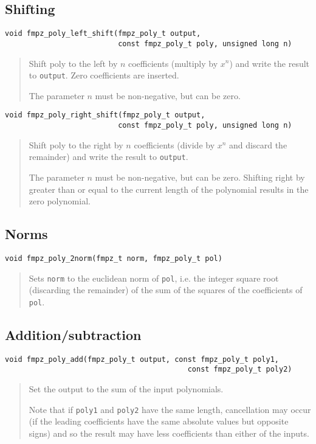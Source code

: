 \documentclass[a4paper,10pt]{article}
\newcommand{\code}{\lstinline}
\begin{document}
\subsection{Shifting}

\begin{lstlisting}
void fmpz_poly_left_shift(fmpz_poly_t output, 
                          const fmpz_poly_t poly, unsigned long n) 
\end{lstlisting}
\begin{quote}
Shift poly to the left by $n$ coefficients (multiply by $x^n$) and write the result to \code{output}. Zero coefficients are inserted.

The parameter $n$ must be non-negative, but can be zero.
\end{quote}

\begin{lstlisting}
void fmpz_poly_right_shift(fmpz_poly_t output, 
                          const fmpz_poly_t poly, unsigned long n) 
\end{lstlisting}
\begin{quote}
Shift poly to the right by $n$ coefficients (divide by $x^n$ and discard the remainder) and write the result to \code{output}. 

The parameter $n$ must be non-negative, but can be zero. Shifting right by greater than or equal to the current length of the polynomial results in the zero polynomial.
\end{quote}

\subsection{Norms}

\begin{lstlisting}
void fmpz_poly_2norm(fmpz_t norm, fmpz_poly_t pol)
\end{lstlisting}
\begin{quote}
Sets \code{norm} to the euclidean norm of \code{pol}, i.e. the integer square root (discarding the remainder) of the sum of the squares of the coefficients of \code{pol}.
\end{quote}

\subsection{Addition/subtraction}

\begin{lstlisting}
void fmpz_poly_add(fmpz_poly_t output, const fmpz_poly_t poly1, 
                                          const fmpz_poly_t poly2) 
\end{lstlisting}
\begin{quote}
Set the output to the sum of the input polynomials. 

Note that if \code{poly1} and \code{poly2} have the same length, cancellation may occur (if the leading coefficients have the same absolute values but opposite signs) and so the result may have less coefficients than either of the inputs. 
\end{quote}
\end{document}

